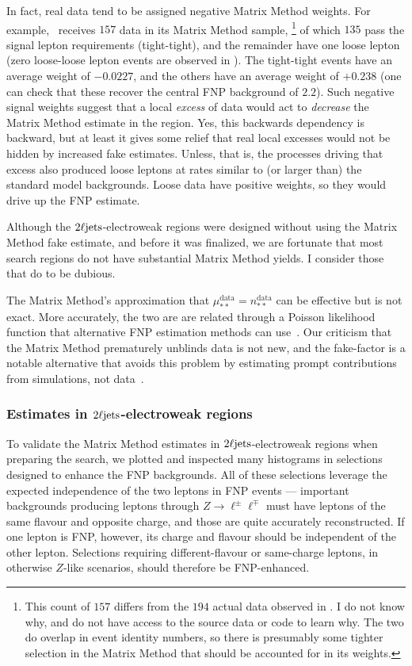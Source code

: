 In fact, real data tend to be assigned negative Matrix Method weights.
For example, \crvz\ receives $157$ data in its Matrix Method sample,%
\footnote{%
This count of $157$ differs from the $194$ actual data observed in \crvz.
I do not know why, and do not have access to the source data or code to
learn why.
The two do overlap in event identity numbers, so there is presumably some
tighter selection in the Matrix Method that should be accounted for in its
weights.
}
of which $135$ pass the signal lepton requirements (tight-tight),
and the remainder have one loose lepton (zero loose-loose lepton events
are observed in \crvz).
The tight-tight events have an average weight of $-0.0227$, and the others
have an average weight of $+0.238$ (one can check that these recover the
central FNP background of $2.2$).
Such negative signal weights suggest that a local \emph{excess} of data
would act to \emph{decrease} the Matrix Method estimate in the region.
Yes, this backwards dependency is backward, but at least it gives some relief
that real local excesses would not be hidden by increased fake estimates.
Unless, that is, the processes driving that excess also produced loose leptons
at rates similar to (or larger than) the standard model backgrounds.
Loose data have positive weights, so they would drive up the FNP estimate.

Although the $2\ell\mathrm{jets}$-electroweak regions were designed without using the
Matrix Method fake estimate, and before it was finalized, we are fortunate that
most search regions do not have substantial Matrix Method yields.
I consider those that do to be dubious.

The Matrix Method's approximation that
$\mu^\textrm{data}_{**} = n^\textrm{data}_{**}$ can be effective but is not
exact.
More accurately, the two are are related through a Poisson likelihood function
that alternative FNP estimation methods can use~\cite{
Erdmann:2021pqi,
Gillam:2014xua
}.
Our criticism that the Matrix Method prematurely unblinds data is not new, and
the fake-factor is a notable alternative that avoids this problem by estimating
prompt contributions from simulations, not data~\cite{
Alison2015,
ATLAS:2017ztq
}.

\subsubsection{%
Estimates in \texorpdfstring{$2\ell\mathrm{jets}$}{2Ljets}-electroweak regions%
}
To validate the Matrix Method estimates in $2\ell\mathrm{jets}$-electroweak regions
when preparing the search, we plotted and inspected many histograms in
selections designed to enhance the FNP backgrounds.
All of these selections leverage the expected independence of the two leptons
in FNP events --- important backgrounds producing leptons through
$Z\rightarrow \ell^\pm\ell^\mp$ must have leptons of the same flavour and
opposite charge, and those are quite accurately reconstructed.
If one lepton is FNP, however, its charge and flavour should be
independent of the other lepton.
Selections requiring different-flavour or same-charge leptons,
in otherwise $Z$-like scenarios, should therefore be
FNP-enhanced.

